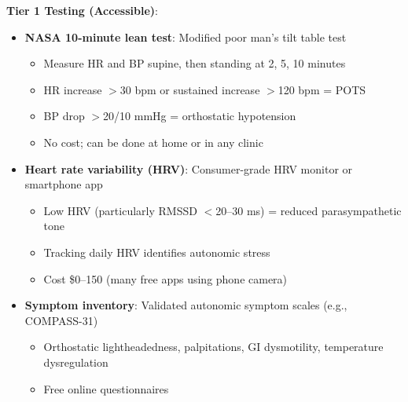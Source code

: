 \textbf{Tier 1 Testing (Accessible)}:
\begin{itemize}
    \item \textbf{NASA 10-minute lean test}: Modified poor man's tilt table test
    \begin{itemize}
        \item Measure HR and BP supine, then standing at 2, 5, 10 minutes
        \item HR increase $>$30 bpm or sustained increase $>$120 bpm = POTS
        \item BP drop $>$20/10 mmHg = orthostatic hypotension
        \item No cost; can be done at home or in any clinic
    \end{itemize}

    \item \textbf{Heart rate variability (HRV)}: Consumer-grade HRV monitor or smartphone app
    \begin{itemize}
        \item Low HRV (particularly RMSSD $<$20--30 ms) = reduced parasympathetic tone
        \item Tracking daily HRV identifies autonomic stress
        \item Cost \$0--150 (many free apps using phone camera)
    \end{itemize}

    \item \textbf{Symptom inventory}: Validated autonomic symptom scales (e.g., COMPASS-31)
    \begin{itemize}
        \item Orthostatic lightheadedness, palpitations, GI dysmotility, temperature dysregulation
        \item Free online questionnaires
    \end{itemize}
\end{itemize}

